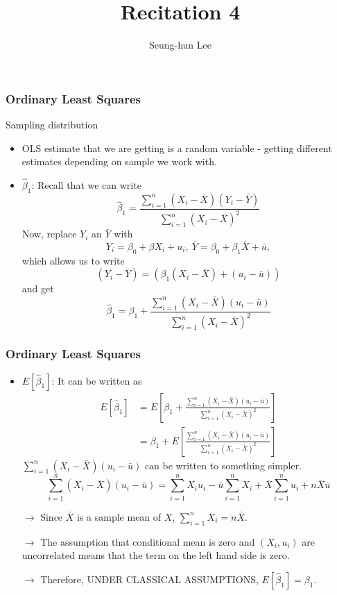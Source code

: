 \documentclass[compress]{beamer}
\title[Recitation 4]{Recitation 4} %
\author[Seung-hun Lee]{Seung-hun Lee}
\institute[Columbia University]{Columbia University}
\date[]{}
\begin{document}
\begin{frame}
\titlepage
\end{frame}



\begin{frame}
\frametitle{Ordinary Least Squares}
Sampling distribution 
\begin{itemize}
\item OLS estimate that we are getting is a random variable - getting different estimates depending on sample we work with. 
\item$\hat{\beta}_1$: Recall that we can write
\[
\hat{\beta}_1= \frac{\sum_{i=1}^n(X_i-\bar{X})(Y_i-\bar{Y})}{\sum_{i=1}^n(X_i-\bar{X})^2}
\]
Now, replace $Y_i$ an $\bar{Y}$ with 
\[
Y_i =\beta_0 + \beta X_i + u_i, \ \bar{Y} = \beta_0 + \beta_1\bar{X} + \bar{u},
\]
which allows us to write 
\[
(Y_i-\bar{Y}) = (\beta_1(X_i-\bar{X})+(u_i-\bar{u}))
\]
and get
\[
\hat{\beta}_1=\beta_1+  \frac{\sum_{i=1}^n(X_i-\bar{X})(u_i-\bar{u})}{\sum_{i=1}^n(X_i-\bar{X})^2}
\]

\end{itemize}
\end{frame}

\begin{frame}
\frametitle{Ordinary Least Squares}
\begin{itemize}
\item $E[\hat{\beta}_1]$: It can be written as
\small{\[
\begin{aligned}
E[\hat{\beta}_1]& = E\left[\beta_1+  \frac{\sum_{i=1}^n(X_i-\bar{X})(u_i-\bar{u})}{\sum_{i=1}^n(X_i-\bar{X})^2}\right]\\
&=\beta_1+ E\left[\frac{\sum_{i=1}^n(X_i-\bar{X})(u_i-\bar{u})}{\sum_{i=1}^n(X_i-\bar{X})^2}\right]
\end{aligned}
\]}\normalsize
$\sum_{i=1}^n(X_i-\bar{X})(u_i-\bar{u})$ can be written to something simpler.
\small{\[
\sum_{i=1}^n(X_i-\bar{X})(u_i-\bar{u})=\sum_{i=1}^nX_iu_i-\bar{u}\sum_{i=1}^n X_i+\bar{X}\sum_{i=1}^nu_i+n\bar{X}\bar{u}
\]}\normalsize
\item[$\to$] Since $\bar{X}$ is a sample mean of $X$, $\sum_{i=1}^nX_i=n\bar{X}$. \\
\item[$\to$] The assumption that conditional mean is zero and $(X_i, u_i)$ are uncorrelated means that the term on the left hand side is zero. 
\item[$\to$] Therefore, UNDER CLASSICAL ASSUMPTIONS, $E[\hat{\beta}_1]=\beta_1$.

\end{itemize}
\end{frame}
\end{document}
